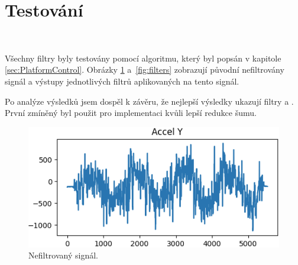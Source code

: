 \section{Testování}\

Všechny filtry byly testovány pomocí algoritmu, který byl popsán v kapitole
\ref{sec:PlatformControl}. Obrázky \ref{fig:NoFilter} a~\ref{fig:filters} zobrazují
původní nefiltrovány signál a výstupy jednotlivých filtrů aplikovaných na tento
signál.

Po analýze výsledků jsem dospěl k závěru, že nejlepší výsledky ukazují filtry
 a . První zmíněný byl 
použit pro implementaci kvůli lepší redukce šumu.

\begin{figure}[!h]
	\centering
    \includegraphics[width = 0.7\linewidth]{Figures/NoFilter.png}
    \caption{Nefiltrovaný signál.}
    \label{fig:NoFilter}
\end{figure}


